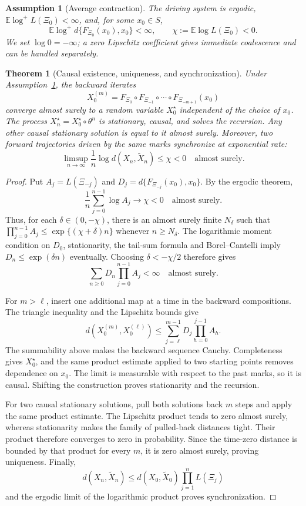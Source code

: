 \documentclass[11pt]{article}
\newtheorem{assumption}[definition]{Assumption}
\newtheorem{theorem}[definition]{Theorem}
\begin{document}
\begin{assumption}[Average contraction]\label{ass:average-contraction}
The driving system is ergodic, $\mathbb E\log^+L(\Xi_0)<\infty$, and, for
some $x_0\in S$,
\[
\mathbb E\log^+d\{F_{\Xi_0}(x_0),x_0\}<\infty,\qquad
\chi:=\mathbb E\log L(\Xi_0)<0.
\]
We set $\log 0=-\infty$; a zero Lipschitz coefficient gives immediate
coalescence and can be handled separately.
\end{assumption}

\begin{theorem}[Causal existence, uniqueness, and synchronization]
\label{thm:stochastic-descent}
Under Assumption~\ref{ass:average-contraction}, the backward iterates
\[
X_0^{(m)}=
F_{\Xi_0}\circ F_{\Xi_{-1}}\circ\cdots\circ F_{\Xi_{-m+1}}(x_0)
\]
converge almost surely to a random variable $X_0^\star$ independent of the
choice of $x_0$.  The process $X_n^\star=X_0^\star\circ\theta^n$ is stationary,
causal, and solves the recursion.  Any other causal stationary solution is
equal to it almost surely.  Moreover, two forward trajectories driven by the
same marks synchronize at exponential rate:
\[
\limsup_{n\to\infty}\frac1n
\log d(X_n,\widetilde X_n)\le\chi<0
\quad\text{almost surely}.
\]
\end{theorem}

\begin{proof}
Put $A_j=L(\Xi_{-j})$ and
$D_j=d\{F_{\Xi_{-j}}(x_0),x_0\}$.  By the ergodic theorem,
\[
 \frac{1}{n}\sum_{j=0}^{n-1}\log A_j\longrightarrow\chi<0
 \quad\text{almost surely}.
\]
Thus, for each $\delta\in(0,-\chi)$, there is an almost surely finite
$N_\delta$ such that
\(\prod_{j=0}^{n-1}A_j\le\exp\{(\chi+\delta)n\}\) whenever
$n\ge N_\delta$.  The logarithmic moment condition on $D_0$, stationarity,
the tail-sum formula and Borel--Cantelli imply
$D_n\le\exp(\delta n)$ eventually.  Choosing
$\delta<-\chi/2$ therefore gives
\[
 \sum_{n\ge0}D_n\prod_{j=0}^{n-1}A_j<\infty
 \quad\text{almost surely}.
\]

For $m>\ell$, insert one additional map at a time in the backward
compositions.  The triangle inequality and the Lipschitz bounds give
\[
d(X_0^{(m)},X_0^{(\ell)})
\le \sum_{j=\ell}^{m-1}D_j\prod_{h=0}^{j-1}A_h .
\]
The summability above makes the backward sequence Cauchy.  Completeness gives
$X_0^\star$, and the same product estimate applied to two starting points
removes dependence on $x_0$.  The limit is measurable with respect to the
past marks, so it is causal.  Shifting the construction proves stationarity
and the recursion.

For two causal stationary solutions, pull both solutions back $m$ steps and
apply the same product estimate.  The Lipschitz product tends to zero almost
surely, whereas stationarity makes the family of pulled-back distances tight.
Their product therefore converges to zero in probability.  Since the
time-zero distance is bounded by that product for every $m$, it is zero almost
surely, proving uniqueness.  Finally,
\[
d(X_n,\widetilde X_n)
\le d(X_0,\widetilde X_0)\prod_{j=1}^nL(\Xi_j)
\]
and the ergodic limit of the logarithmic product proves synchronization.
\end{proof}
\end{document}
